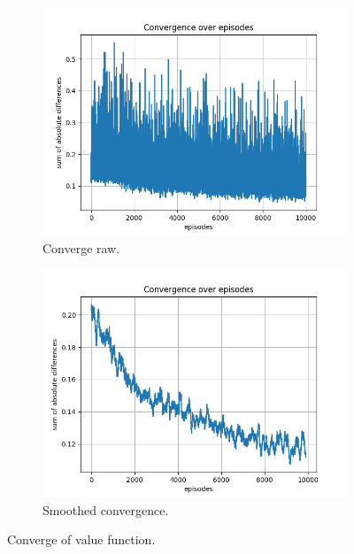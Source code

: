 \documentclass{assignment}
\begin{document}
\begin{figure}[H]
    \begin{subfigure}{0.5\textwidth}
        \includegraphics[width=\textwidth]{figures/convergence_td/alpha_sweep/convergence_TD_alpha_0.001_gamma_0.95_epislon_0.2.png}
    \caption{Converge raw.}
    \end{subfigure}\hfill
    \begin{subfigure}{0.5\textwidth}
        \includegraphics[width=\textwidth]{figures/convergence_td/alpha_sweep/convergence_TD_smoothed_alpha_0.001_gamma_0.95_epislon_0.2.png}
    \caption{Smoothed convergence.}
    \end{subfigure}
    \caption{Converge of value function.}
    \label{fig:alpha_0.001_td_learning_convergence}
\end{figure}
\end{document}
